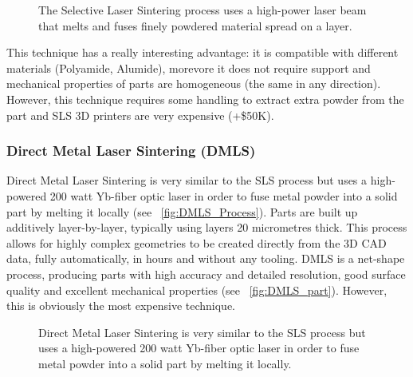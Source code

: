 \begin{figure}[tb]
    \centering
        \hfil
        \hfil
    \caption{The Selective Laser Sintering process uses a high-power laser beam that melts and fuses finely powdered material spread on a layer.}
    \label{fig:SLS_technique}
\end{figure}

This technique has a really interesting advantage: it is compatible with different materials (Polyamide, Alumide), morevore it does not require support and mechanical properties of parts are homogeneous (the same in any direction). However, this technique requires some handling to extract extra powder from the part and SLS 3D printers are very expensive (+\$50K).


\subsubsection{Direct Metal Laser Sintering (DMLS)} %

Direct Metal Laser Sintering is very similar to the SLS process but uses a high-powered 200 watt Yb-fiber optic laser in order to fuse metal powder into a solid part by melting it locally (see \figurename~\ref{fig:DMLS_Process}). Parts are built up additively layer-by-layer, typically using layers 20 micrometres thick. This process allows for highly complex geometries to be created directly from the 3D CAD data, fully automatically, in hours and without any tooling. DMLS is a net-shape process, producing parts with high accuracy and detailed resolution, good surface quality and excellent mechanical properties (see \figurename~\ref{fig:DMLS_part}). However, this is obviously the most expensive technique.

\begin{figure}[tb]
    \centering
        \hfil
        \hfil
    \caption{Direct Metal Laser Sintering is very similar to the SLS process but uses a high-powered 200 watt Yb-fiber optic laser in order to fuse metal powder into a solid part by melting it locally.}
    \label{fig:DMLS_technique}
\end{figure}


